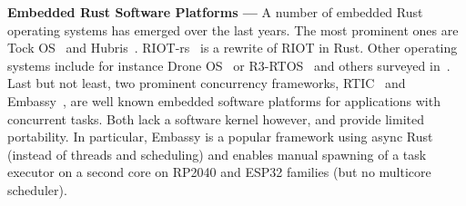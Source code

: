 \textbf{Embedded Rust Software Platforms ---} A number of embedded Rust operating systems has emerged over the last years. 
The most prominent ones are Tock OS~\cite{levy2017tock} and Hubris~\cite{hubris}. RIOT-rs~\cite{riot-rs} is a rewrite of RIOT in Rust. %
Other operating systems include for instance Drone OS~\cite{drone-os} %
or R3-RTOS~\cite{r3-rtos} and others surveyed in~\cite{vandervelden2024rust-os}.
Last but not least, two prominent concurrency frameworks, RTIC~\cite{rtic} and Embassy~\cite{embassy}, are well known embedded software platforms for applications with concurrent tasks. 
Both lack a software kernel however, and provide limited portability.
In particular, Embassy is a popular framework using async Rust (instead of threads and scheduling) and enables manual spawning of a task executor on a second core on RP2040 and ESP32 families (but no multicore scheduler). %


